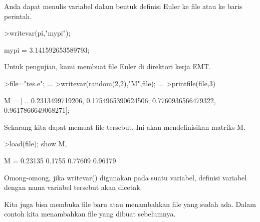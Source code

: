 \documentclass{article}
\begin{document}
\begin{eulernotebook}
\begin{eulercomment}
\begin{eulercomment}
\begin{eulercomment}
\begin{eulercomment}
\begin{eulercomment}
\begin{eulercomment}
\begin{eulercomment}
\begin{eulercomment}
\begin{eulercomment}
\begin{eulercomment}
\begin{eulercomment}
\begin{eulercomment}
\begin{eulercomment}
\begin{eulercomment}
\begin{eulercomment}
\begin{eulercomment}
\begin{eulercomment}
Anda dapat menulis variabel dalam bentuk definisi Euler ke file atau
ke baris perintah.
\end{eulercomment}
\begin{eulerprompt}
>writevar(pi,"mypi");
\end{eulerprompt}
\begin{euleroutput}
  mypi = 3.141592653589793;
\end{euleroutput}
\begin{eulercomment}
Untuk pengujian, kami membuat file Euler di direktori kerja EMT.
\end{eulercomment}
\begin{eulerprompt}
>file="tes.e"; ...
>writevar(random(2,2),"M",file); ...
>printfile(file,3)
\end{eulerprompt}
\begin{euleroutput}
  M = [ ..
  0.2313499719206, 0.1754965390624506;
  0.7760936566479322, 0.9617866649068271];
\end{euleroutput}
\begin{eulercomment}
Sekarang kita dapat memuat file tersebut. Ini akan mendefinisikan
matriks M.
\end{eulercomment}
\begin{eulerprompt}
>load(file); show M,
\end{eulerprompt}
\begin{euleroutput}
  M = 
    0.23135    0.1755 
    0.77609   0.96179 
\end{euleroutput}
\begin{eulercomment}
Omong-omong, jika writevar() digunakan pada suatu variabel, definisi
variabel dengan nama variabel tersebut akan dicetak.
\end{eulercomment}
\begin{eulercomment}
Kita juga bisa membuka file baru atau menambahkan file yang sudah ada.
Dalam contoh kita menambahkan file yang dibuat sebelumnya.
\end{eulercomment}
\begin{eulerprompt}

\end{eulerprompt}
\end{eulercomment}
\end{eulercomment}
\end{eulercomment}
\end{eulercomment}
\end{eulercomment}
\end{eulercomment}
\end{eulercomment}
\end{eulercomment}
\end{eulercomment}
\end{eulercomment}
\end{eulercomment}
\end{eulercomment}
\end{eulercomment}
\end{eulercomment}
\end{eulercomment}
\end{eulercomment}
\end{eulernotebook}
\end{document}
